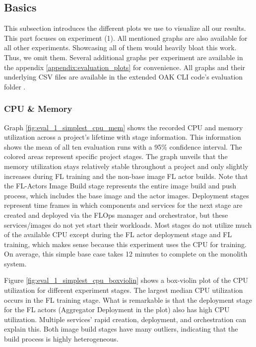 \subsection{Basics} \label{subsection:eval_basics}

This subsection introduces the different plots we use to visualize all our results.
This part focuses on experiment (1).
All mentioned graphs are also available for all other experiments.
Showcasing all of them would heavily bloat this work.
Thus, we omit them.
Several additional graphs per experiment are available in the appendix \ref{appendix:evaluation_plots} for convenience.
All graphs and their underlying CSV files are available in the extended OAK CLI code's evaluation folder \cite{cli_code}.


\subsubsection{CPU \& Memory}

Graph \ref{fig:eval_1_simplest_cpu_mem} shows the recorded CPU and memory utilization across a project's lifetime with stage information.
This information shows the mean of all ten evaluation runs with a 95\% confidence interval.
The colored areas represent specific project stages.
The graph unveils that the memory utilization stays relatively stable throughout a project and only slightly increases during FL training and the non-base image FL actor builds.
Note that the FL-Actors Image Build stage represents the entire image build and push process, which includes the base image and the actor images.
Deployment stages represent time frames in which components and services for the next stage are created and deployed via the FLOps manager and orchestrator, but these services/images do not yet start their workloads.
Most stages do not utilize much of the available CPU except during the FL actor deployment stage and FL training, which makes sense because this experiment uses the CPU for training.
On average, this simple base case takes 12 minutes to complete on the monolith system.

Figure \ref{fig:eval_1_simplest_cpu_boxviolin} shows a box-violin plot of the CPU utilization for different experiment stages.
The largest median CPU utilization occurs in the FL training stage.
What is remarkable is that the deployment stage for the FL actors (Aggregator Deployment in the plot) also has high CPU utilization.
Multiple services' rapid creation, deployment, and orchestration can explain this.
Both image build stages have many outliers, indicating that the build process is highly heterogeneous.

